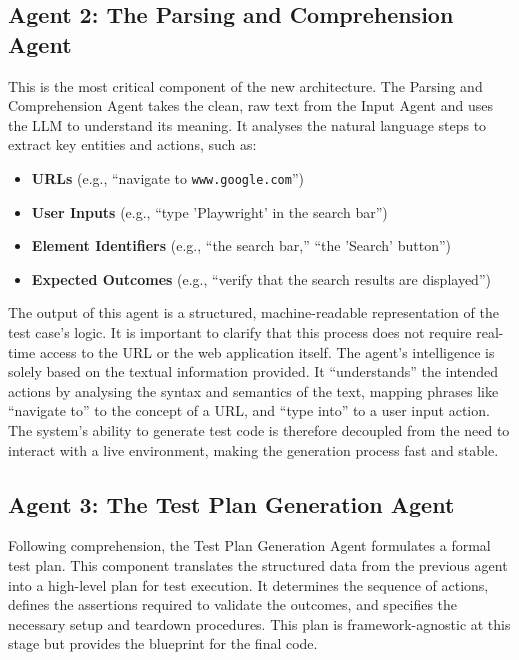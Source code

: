 \documentclass{article}
\begin{document}
\subsection{Agent 2: The Parsing and Comprehension Agent}
This is the most critical component of the new architecture. The Parsing and Comprehension Agent takes the clean, raw text from the Input Agent and uses the LLM to understand its meaning. It analyses the natural language steps to extract key entities and actions, such as:
\begin{itemize}
    \item \textbf{URLs} (e.g., ``navigate to \texttt{www.google.com}'')
    \item \textbf{User Inputs} (e.g., ``type 'Playwright' in the search bar'')
    \item \textbf{Element Identifiers} (e.g., ``the search bar,'' ``the 'Search' button'')
    \item \textbf{Expected Outcomes} (e.g., ``verify that the search results are displayed'')
\end{itemize}
The output of this agent is a structured, machine-readable representation of the test case's logic. It is important to clarify that this process does not require real-time access to the URL or the web application itself. The agent's intelligence is solely based on the textual information provided. It ``understands'' the intended actions by analysing the syntax and semantics of the text, mapping phrases like ``navigate to'' to the concept of a URL, and ``type into'' to a user input action. The system's ability to generate test code is therefore decoupled from the need to interact with a live environment, making the generation process fast and stable.

\subsection{Agent 3: The Test Plan Generation Agent}
Following comprehension, the Test Plan Generation Agent formulates a formal test plan. This component translates the structured data from the previous agent into a high-level plan for test execution. It determines the sequence of actions, defines the assertions required to validate the outcomes, and specifies the necessary setup and teardown procedures. This plan is framework-agnostic at this stage but provides the blueprint for the final code.
\end{document}
